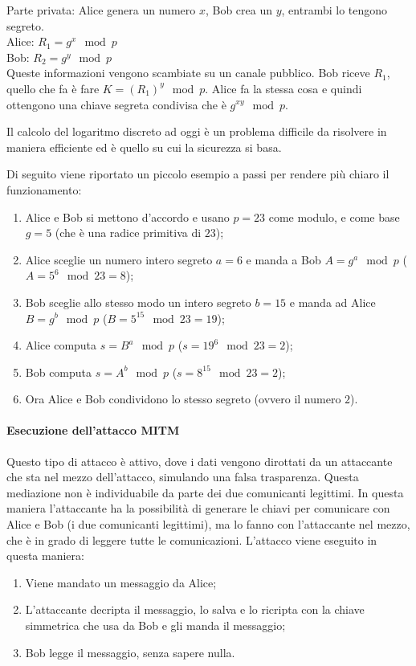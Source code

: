
Parte privata: Alice genera un numero $x$, Bob crea un $y$, entrambi lo tengono
segreto.\\
\newline
Alice: $R_1 = g^x \mod p$\\
Bob: $R_2 = g^y \mod p$\\
\newline
Queste informazioni vengono scambiate su un canale pubblico. Bob riceve $R_1$,
quello che fa è fare $K = (R_1)^y \mod p$. Alice fa la stessa cosa e quindi
ottengono una chiave segreta condivisa che è $g^{xy} \mod p$.

Il calcolo del logaritmo discreto ad oggi è un problema difficile da
risolvere in maniera efficiente ed è quello su cui la sicurezza si basa.


Di seguito viene riportato un piccolo esempio a passi per rendere più chiaro
il funzionamento:
\begin{enumerate}
 \item Alice e Bob si mettono d'accordo e usano $p = 23$ come modulo, e come
base $g = 5$ (che \`e una radice primitiva di $23$);
 \item Alice sceglie un numero intero segreto $a = 6$ e manda a Bob $A = g^a
\mod p$ ($A = 5^6 \mod 23 = 8$);
 \item Bob sceglie allo stesso modo un intero segreto $b = 15$ e manda ad Alice
$B = g^b \mod p$ ($B = 5^{15} \mod 23 = 19$);
 \item Alice computa $s = B^a \mod p$ ($s = 19^6 \mod 23 = 2$);
 \item Bob computa $s = A^b \mod p$ ($s = 8^{15} \mod 23 = 2$);
 \item Ora Alice e Bob condividono lo stesso segreto (ovvero il numero $2$).

\end{enumerate}


\paragraph{Esecuzione dell'attacco MITM}

Questo tipo di attacco è attivo, dove i dati vengono dirottati da un attaccante
che sta nel mezzo dell'attacco, simulando una falsa trasparenza. Questa
mediazione non è individuabile da parte dei due comunicanti legittimi. In
questa maniera l'attaccante ha la possibilità di generare le chiavi per
comunicare con Alice e Bob (i due comunicanti legittimi), ma lo fanno con
l'attaccante nel mezzo, che è in grado di leggere tutte le comunicazioni.
L'attacco viene eseguito in questa maniera:
\begin{enumerate}
\item Viene mandato un messaggio da Alice;
\item L'attaccante decripta il messaggio, lo salva e lo ricripta con la chiave
simmetrica che usa da Bob e gli manda il messaggio;
\item Bob legge il messaggio, senza sapere nulla.
\end{enumerate}


